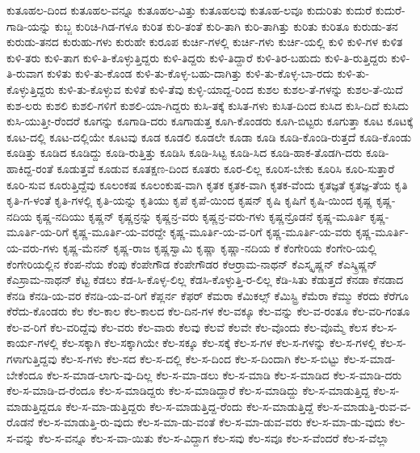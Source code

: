 {ಕುತೂಹಲ-ದಿಂದ
ಕುತೂಹಲ-ವನ್ನೂ
ಕುತೂಹಲ-ವಿತ್ತು
ಕುತೂಹಲವು
ಕುತೂಹ-ಲವೂ
ಕುದುರಿತು
ಕುದುರೆ
ಕುದುರೆ-ಗಾಡಿ-ಯನ್ನು
ಕುಬ್ಜ
ಕುರಿಚಿ-ಗಿಡ-ಗಳೂ
ಕುರಿತ
ಕುರಿ-ತಂತೆ
ಕುರಿ-ತಾಗಿ
ಕುರಿ-ತಾಗಿತ್ತು
ಕುರಿತು
ಕುರಿತೂ
ಕುರುಡು-ತನ
ಕುರುಡು-ತನದ
ಕುರುಹು-ಗಳು
ಕುರುಹೇ
ಕುರೂಪ
ಕುರ್ಚಿ-ಗಳಲ್ಲಿ
ಕುರ್ಚಿ-ಗಳು
ಕುರ್ಚಿ-ಯಲ್ಲಿ
ಕುಳಿ
ಕುಳಿ-ಗಳ
ಕುಳಿತ
ಕುಳಿ-ತರು
ಕುಳಿ-ತಾಗ
ಕುಳಿ-ತಿ-ಕೊಳ್ಳುತ್ತಿದ್ದರು
ಕುಳಿ-ತಿದ್ದರು
ಕುಳಿ-ತಿದ್ದಾರೆ
ಕುಳಿ-ತಿರ-ಬಹುದು
ಕುಳಿ-ತಿ-ರುತ್ತಿದ್ದರು
ಕುಳಿ-ತಿ-ರುವಾಗ
ಕುಳಿತು
ಕುಳಿ-ತು-ಕೊಂಡ
ಕುಳಿ-ತು-ಕೊಳ್ಳ-ಬಹು-ದಾಗಿತ್ತು
ಕುಳಿ-ತು-ಕೊಳ್ಳ-ಬಾ-ರದು
ಕುಳಿ-ತು-ಕೊಳ್ಳುತ್ತಿದ್ದರು
ಕುಳಿ-ತು-ಕೊಳ್ಳುವ
ಕುಳಿತೆ
ಕುಳಿ-ತೆವು
ಕುಳ್ಳಿ-ಯಾದ್ದ-ರಿಂದ
ಕುಶಲ
ಕುಶಲ-ತೆ-ಗಳನ್ನು
ಕುಶಲ-ತೆ-ಯಿದೆ
ಕುಶ-ಲರು
ಕುಶಲಿ
ಕುಶಲಿ-ಗಳಿಗೆ
ಕುಶಲಿ-ಯಾ-ಗಿದ್ದರು
ಕುಸಿ-ತಕ್ಕೆ
ಕುಸಿತ-ಗಳು
ಕುಸಿತ-ದಿಂದ
ಕುಸಿದ
ಕುಸಿ-ದಿದೆ
ಕುಸಿದು
ಕುಸಿ-ಯುತ್ತೀ-ರೆಂದರೆ
ಕೂಗನ್ನು
ಕೂಗಾಡಿ-ದರು
ಕೂಗಾಡುತ್ತ
ಕೂಗಿ-ಕೊಂಡರು
ಕೂಗಿ-ಬಿಟ್ಟರು
ಕೂಗುತ್ತಾ
ಕೂಟ
ಕೂಟಕ್ಕೆ
ಕೂಟ-ದಲ್ಲಿ
ಕೂಟ-ದಲ್ಲಿಯೇ
ಕೂಟವು
ಕೂಡ
ಕೂಡಲಿ
ಕೂಡಲೇ
ಕೂಡಾ
ಕೂಡಿ
ಕೂಡಿ-ಕೊಂಡಿ-ರುತ್ತದೆ
ಕೂಡಿ-ಕೊಂಡು
ಕೂಡಿತ್ತು
ಕೂಡಿದ
ಕೂಡಿದ್ದು
ಕೂಡಿ-ರುತ್ತಿತ್ತು
ಕೂಡಿಸಿ
ಕೂಡಿ-ಸಿಟ್ಟ
ಕೂಡಿ-ಸಿದ
ಕೂಡಿ-ಹಾಕ-ತೊಡಗಿ-ದರು
ಕೂಡಿ-ಹಾಕಿದ್ದ-ರಂತೆ
ಕೂಡುತ್ತವೆ
ಕೂಡುವ
ಕೂತಕ್ಷಣ-ದಿಂದ
ಕೂತರು
ಕೂರ-ಲಿಲ್ಲ
ಕೂರಿಸ-ಬೇಕು
ಕೂರಿಸಿ
ಕೂರಿ-ಸುತ್ತಾರೆ
ಕೂರಿ-ಸುವ
ಕೂರುತ್ತಿದ್ದೆವು
ಕೂಲಂಕಷ
ಕೂಲಂಕುಷ-ವಾಗಿ
ಕೃತಕ
ಕೃತಕ-ವಾಗಿ
ಕೃತಕ-ವೆಂದು
ಕೃತಜ್ಞತೆ
ಕೃತಜ್ಞ-ತೆಯ
ಕೃತಿ
ಕೃತಿ-ಗ-ಳಂತೆ
ಕೃತಿ-ಗಳಲ್ಲಿ
ಕೃತಿ-ಯನ್ನು
ಕೃತಿಯು
ಕೃಪೆ
ಕೃಪೆ-ಯಿಂದ
ಕೃಷನ್
ಕೃಷಿ
ಕೃಷಿಗೆ
ಕೃಷಿ-ಯಿಂದ
ಕೃಷ್ಣ
ಕೃಷ್ಣ-ನದಿಯ
ಕೃಷ್ಣ-ನದಿಯು
ಕೃಷ್ಣನ್
ಕೃಷ್ಣನ್ರನ್ನು
ಕೃಷ್ಣನ್ರ-ವರು
ಕೃಷ್ಣನ್ರ-ವರು-ಗಳು
ಕೃಷ್ಣನ್ರೊಡನೆ
ಕೃಷ್ಣ-ಮೂರ್ತಿ
ಕೃಷ್ಣ-ಮೂರ್ತಿ-ಯ-ರಿಗೆ
ಕೃಷ್ಣ-ಮೂರ್ತಿ-ಯ-ವರದ್ದೇ
ಕೃಷ್ಣ-ಮೂರ್ತಿ-ಯ-ವ-ರಿಗೆ
ಕೃಷ್ಣ-ಮೂರ್ತಿ-ಯ-ವರು
ಕೃಷ್ಣ-ಮೂರ್ತಿ-ಯ-ವರು-ಗಳು
ಕೃಷ್ಣ-ಮೆನನ್
ಕೃಷ್ಣ-ರಾಜ
ಕೃಷ್ಣಸ್ವಾಮಿ
ಕೃಷ್ಣಾ
ಕೃಷ್ಣಾ-ನದಿಯ
ಕೆ
ಕೆಂಗೇರಿಯ
ಕೆಂಗೇರಿ-ಯಲ್ಲಿ
ಕೆಂಗೇರಿಯಲ್ಲಿನ
ಕೆಂಪ-ನೆಯ
ಕೆಂಪು
ಕೆಂಪೇಗೌಡ
ಕೆಂಪೇಗೌಡರ
ಕೆಆರ್ರಾಮ-ನಾಥನ್
ಕೆಎಸ್ಕೃಷ್ಣನ್
ಕೆಎಸ್ಕ್ರಿಷ್ಣನ್
ಕೆಎಸ್ರಾಮ-ನಾಥನ್
ಕೆಟ್ಟ
ಕೆಡಲು
ಕೆಡ-ಸಿ-ಕೊಳ್ಳ-ಲಿಲ್ಲ
ಕೆಡಸಿ-ಕೊಳ್ಳುತ್ತಿ-ರ-ಲಿಲ್ಲ
ಕೆಡಿ-ಸಿತು
ಕೆಡುತ್ತದೆ
ಕೆನಡಾ
ಕೆನಡಾದ
ಕೆನಡಿ
ಕೆನಡಿ-ಯ-ವರ
ಕೆನಡಿ-ಯ-ವ-ರಿಗೆ
ಕೆಪ್ಲರ್ನ
ಕೆಫರ್
ಕೆಮರಾ
ಕೆಮಿಕಲ್ಸ್
ಕೆಮಿಸ್ಟ್ರಿ
ಕೆಮೆರಾ
ಕೆಮ್ಮು
ಕೆರದು
ಕೆರೆಗೂ
ಕೆರೆದು-ಕೊಂಡರು
ಕೆಲ
ಕೆಲ-ಕಾಲ
ಕೆಲ-ಕಾಲದ
ಕೆಲ-ದಿನ-ಗಳ
ಕೆಲ-ವಕ್ಕೂ
ಕೆಲ-ವನ್ನು
ಕೆಲ-ವ-ರಂತೂ
ಕೆಲ-ವರಿ-ಗಂತೂ
ಕೆಲ-ವ-ರಿಗೆ
ಕೆಲ-ವರಿದ್ದೆವು
ಕೆಲ-ವರು
ಕೆಲ-ವಾರು
ಕೆಲವು
ಕೆಲವೆ
ಕೆಲವೇ
ಕೆಲ-ವೊಂದು
ಕೆಲ-ವೊಮ್ಮೆ
ಕೆಲಸ
ಕೆಲ-ಸ-ಕಾರ್ಯ-ಗಳಲ್ಲಿ
ಕೆಲ-ಸಕ್ಕಾಗಿ
ಕೆಲ-ಸಕ್ಕಾಗಿಯೇ
ಕೆಲ-ಸಕ್ಕೂ
ಕೆಲ-ಸಕ್ಕೆ
ಕೆಲ-ಸ-ಗಳ
ಕೆಲ-ಸ-ಗಳನ್ನು
ಕೆಲ-ಸ-ಗಳಲ್ಲಿ
ಕೆಲ-ಸ-ಗಳಾಗುತ್ತಿದ್ದವು
ಕೆಲ-ಸ-ಗಳು
ಕೆಲ-ಸದ
ಕೆಲ-ಸ-ದಲ್ಲಿ
ಕೆಲ-ಸ-ದಿಂದ
ಕೆಲ-ಸ-ದಿಂದಾಗಿ
ಕೆಲ-ಸ-ಬಿಟ್ಟು
ಕೆಲ-ಸ-ಮಾಡ-ಬೇಕೆಂದೂ
ಕೆಲ-ಸ-ಮಾಡ-ಲಾಗು-ವು-ದಿಲ್ಲ
ಕೆಲ-ಸ-ಮಾ-ಡಲು
ಕೆಲ-ಸ-ಮಾಡಿ
ಕೆಲ-ಸ-ಮಾಡಿದ
ಕೆಲ-ಸ-ಮಾಡಿ-ದರು
ಕೆಲ-ಸ-ಮಾಡಿ-ದ-ರೆಂದೂ
ಕೆಲ-ಸ-ಮಾಡಿದ್ದರು
ಕೆಲ-ಸ-ಮಾಡಿದ್ದಾರೆ
ಕೆಲ-ಸ-ಮಾಡಿದ್ದು
ಕೆಲ-ಸ-ಮಾಡುತ್ತಿದ್ದ
ಕೆಲ-ಸ-ಮಾಡುತ್ತಿದ್ದದೂ
ಕೆಲ-ಸ-ಮಾ-ಡುತ್ತಿದ್ದರು
ಕೆಲ-ಸ-ಮಾಡುತ್ತಿದ್ದ-ರೆಂದು
ಕೆಲ-ಸ-ಮಾಡುತ್ತಿದ್ದೆ
ಕೆಲ-ಸ-ಮಾಡುತ್ತಿ-ರುವ-ವ-ರೊಡನೆ
ಕೆಲ-ಸ-ಮಾಡುತ್ತಿ-ರು-ವುದು
ಕೆಲ-ಸ-ಮಾ-ಡು-ವಂತೆ
ಕೆಲ-ಸ-ಮಾ-ಡುವ-ವರು
ಕೆಲ-ಸ-ಮಾ-ಡು-ವುದು
ಕೆಲ-ಸ-ವನ್ನು
ಕೆಲ-ಸ-ವನ್ನೂ
ಕೆಲ-ಸ-ವಾ-ಯಿತು
ಕೆಲ-ಸ-ವಿದ್ದಾಗ
ಕೆಲ-ಸವು
ಕೆಲ-ಸವೂ
ಕೆಲ-ಸ-ವೆಂದರೆ
ಕೆಲ-ಸ-ವೆಲ್ಲಾ
}

